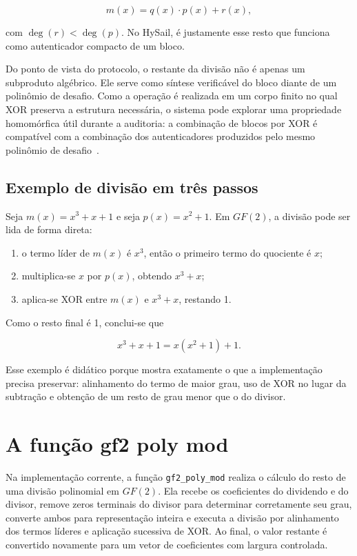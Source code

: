 $$
m(x) = q(x) \cdot p(x) + r(x),
$$

com $\deg(r) < \deg(p)$. No HySail, é justamente esse resto que funciona como autenticador compacto de um bloco.

Do ponto de vista do protocolo, o restante da divisão não é apenas um subproduto algébrico. Ele serve como síntese verificável do bloco diante de um polinômio de desafio. Como a operação é realizada em um corpo finito no qual XOR preserva a estrutura necessária, o sistema pode explorar uma propriedade homomórfica útil durante a auditoria: a combinação de blocos por XOR é compatível com a combinação dos autenticadores produzidos pelo mesmo polinômio de desafio~\cite{amaral2013hysail}.

\subsection{Exemplo de divisão em três passos}%
Seja $m(x) = x^3 + x + 1$ e seja $p(x) = x^2 + 1$. Em $GF(2)$, a divisão pode ser lida de forma direta:

\begin{enumerate}
	\item o termo líder de $m(x)$ é $x^3$, então o primeiro termo do quociente é $x$;
	\item multiplica-se $x$ por $p(x)$, obtendo $x^3 + x$;
	\item aplica-se XOR entre $m(x)$ e $x^3 + x$, restando 1.
\end{enumerate}

Como o resto final é 1, conclui-se que

$$
x^3 + x + 1 = x(x^2 + 1) + 1.
$$

Esse exemplo é didático porque mostra exatamente o que a implementação precisa preservar: alinhamento do termo de maior grau, uso de XOR no lugar da subtração e obtenção de um resto de grau menor que o do divisor.

\section[Função gf2 poly mod]{A função gf2 poly mod}%
Na implementação corrente, a função \texttt{gf2\_poly\_mod} realiza o cálculo do resto de uma divisão polinomial em $GF(2)$. Ela recebe os coeficientes do dividendo e do divisor, remove zeros terminais do divisor para determinar corretamente seu grau, converte ambos para representação inteira e executa a divisão por alinhamento dos termos líderes e aplicação sucessiva de XOR. Ao final, o valor restante é convertido novamente para um vetor de coeficientes com largura controlada.

